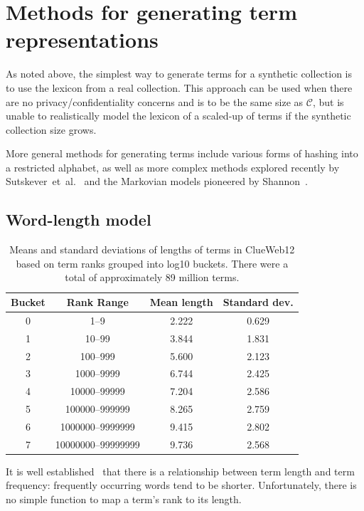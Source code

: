 \documentclass[11pt]{report}
\newcommand{\etal}{et~al.}
\newcommand{\script}[1]{$\mathcal{#1}$}
\begin{document}
\section{Methods for generating term representations}

As noted above, the simplest way to generate terms for a synthetic
collection is to use the lexicon from a real collection. This approach
can be used when there are no privacy/confidentiality concerns and is
to be the same size as \script{C}, but is unable to realistically
model the lexicon of a scaled-up of terms if the synthetic collection
size grows.

More general methods for generating terms include various forms of
hashing into a restricted alphabet, as well as more complex methods
explored recently by
Sutskever~\etal~\cite{sutskeverMartensHinton2011generatingTraffic} and
the Markovian models pioneered by Shannon~\cite{Shannon1948}.

\subsection{Word-length model}

\begin{table} 
\centering
\caption{Means and standard deviations of lengths of terms in ClueWeb12
based on term ranks grouped into log10 buckets. There were a total of
approximately 89 million
terms. \label{length_model} }
\begin{tabular}{cccc}
Bucket &Rank Range & Mean length & Standard dev.\\
\midrule
      0   & 1--9    &  2.222        &   0.629\\
      1   &10--99    &  3.844       &   1.831\\
      2   &100--999    &  5.600       &   2.123\\
      3   &1000--9999    &  6.744       &   2.425\\
      4   &10000--99999    &  7.204       &   2.586\\
      5   &100000--999999    &  8.265       &   2.759\\
      6   &1000000--9999999    &  9.415       &   2.802\\
      7   &10000000--99999999    &  9.736       &   2.568\\
\bottomrule
\end{tabular}
\end{table}

It is well established~\cite{SigurdEW2004,zipf1935psycho} that there
is a relationship between term length and term frequency: frequently
occurring words tend to be shorter.  Unfortunately, there is no simple
function to map a term's rank to its length.
\end{document}
